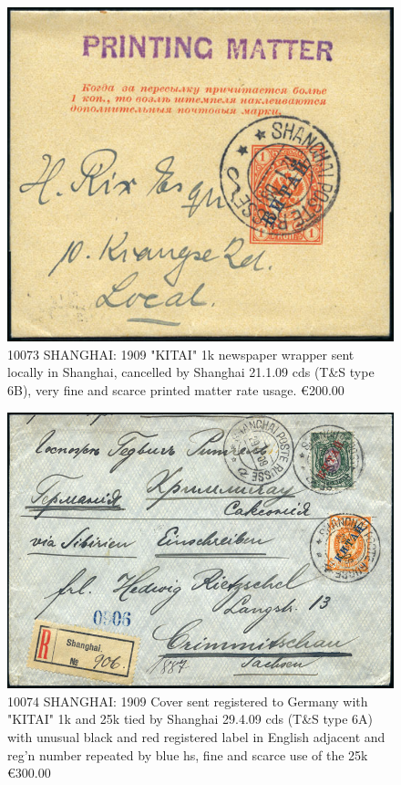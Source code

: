 \begin{figure}[htbp]
\centering
\includegraphics[width=.95\textwidth]{../russian-post-offices-in-china/10073.jpg}
\caption{
10073	SHANGHAI: 1909 "KITAI" 1k newspaper wrapper sent locally in Shanghai, 
cancelled by Shanghai 21.1.09 cds (T\&S type 6B), very fine and scarce 
printed matter rate usage.
\euro 200.00 
}  
\end{figure}

\begin{figure}[htbp]
\centering
\includegraphics[width=.95\textwidth]{../russian-post-offices-in-china/10074.jpg}
\caption{
10074	SHANGHAI: 1909 Cover sent registered to Germany with "KITAI" 1k and 
25k tied by Shanghai 29.4.09 cds (T\&S type 6A) with unusual black and red 
registered label in English adjacent and reg'n number repeated by blue 
hs, fine and scarce use of the 25k
\euro 300.00
}  
\end{figure}

